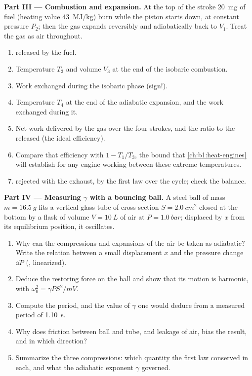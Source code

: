 \begin{problem}
\medskip
\noindent\textbf{Part III --- Combustion and expansion.}
At the top of the stroke \qty{20}{mg} of fuel (heating value
\qty{43}{MJ/kg}) burn while the piston starts down, at constant pressure
$P_2$; then the gas expands reversibly and adiabatically back to $V_1$.
Treat the gas as air throughout.
\begin{enumerate}[resume]
  \item {} released by the fuel.
  \item Temperature $T_3$ and volume $V_3$ at the end of the isobaric
        combustion.
  \item Work exchanged during the isobaric phase (sign!).
  \item Temperature $T_4$ at the end of the adiabatic expansion, and the
        work exchanged during it.
  \item Net work delivered by the gas over the four strokes, and the
        ratio to the  released (the ideal efficiency).
  \item Compare that efficiency with $1 - T_1/T_3$, the bound that
        \cref{ch:b1:heat-engines} will establish for any engine working
        between these extreme temperatures.
  \item {} rejected with the exhaust, by the first law over the cycle;
        check the balance.
\end{enumerate}

\medskip
\noindent\textbf{Part IV --- Measuring $\gamma$ with a bouncing ball.}
A steel ball of mass $m = \qty{16.5}{g}$ fits a vertical glass tube of
cross-section $S = \qty{2.0}{cm^2}$ closed at the bottom by a flask of
volume $V = \qty{10}{L}$ of air at $P = \qty{1.0}{bar}$; displaced by $x$
from its equilibrium position, it oscillates.
\begin{enumerate}[resume]
  \item Why can the compressions and expansions of the air be taken as
        adiabatic? Write the relation between a small displacement $x$
        and the pressure change $\dd P$ (, linearized).
  \item Deduce the restoring force on the ball and show that its motion
        is harmonic, with $\omega_0^2 = \gamma PS^2/mV$.
  \item Compute the period, and the value of $\gamma$ one would deduce
        from a measured period of \qty{1.10}{s}.
  \item Why does friction between ball and tube, and leakage of air, bias
        the result, and in which direction?
  \item Summarize the three compressions: which quantity the first law
        conserved in each, and what the adiabatic exponent $\gamma$
        governed.
\end{enumerate}
\end{problem}
